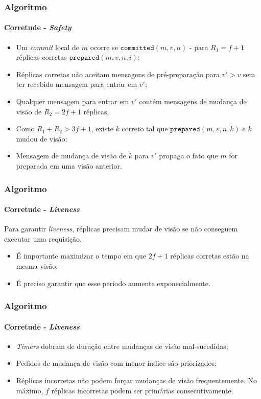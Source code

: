 \documentclass{beamer}
\begin{document}
\begin{frame}
  \frametitle{Algoritmo}
  \framesubtitle{Corretude - \textit{Safety}}

  \begin{itemize}
    \item
      Um \textit{commit} local de $m$ ocorre se $\texttt{committed}(m, v, n)$ - para $R_1 = f + 1$ réplicas corretas $\texttt{prepared}(m, v, n, i)$;

      \pause
    \item
      Réplicas corretas não aceitam mensagens de pré-preparação para $v' > v$ sem ter recebido mensagem para entrar em $v'$;

      \pause
    \item
      Qualquer mensagem para entrar em $v'$ contém mensagens de mudança de visão de $R_2 = 2f + 1$ réplicas;

      \pause
    \item
      Como $R_1 + R_2 > 3f + 1$, existe $k$ correto tal que $\texttt{prepared}(m, v, n, k)$ e $k$ mudou de visão;

      \pause
    \item
      Mensagem de mudança de visão de $k$ para $v'$ propaga o fato que $m$ for preparada em uma visão anterior.
  \end{itemize}
\end{frame}

\begin{frame}
  \frametitle{Algoritmo}
  \framesubtitle{Corretude - \textit{Liveness}}

  Para garantir \textit{liveness}, réplicas precisam mudar de visão se não conseguem executar uma requisição.
  \begin{itemize}
    \item
      É importante maximizar o tempo em que $2f + 1$ réplicas corretas estão na mesma visão;
      
    \item
      É preciso garantir que esse período aumente exponecialmente.
  \end{itemize}
\end{frame}

\begin{frame}
  \frametitle{Algoritmo}
  \framesubtitle{Corretude - \textit{Liveness}}

  \begin{itemize}
    \item
      \textit{Timers} dobram de duração entre mudanças de visão mal-sucedidas;

      \pause
    \item
      Pedidos de mudança de visão com menor índice são priorizados;

      \pause
    \item
      Réplicas incorretas não podem forçar mudanças de visão frequentemente. No máximo, $f$ réplicas incorretas podem ser primárias consecutivamente.
  \end{itemize}

\end{frame}
\end{document}

